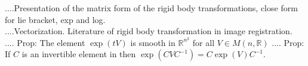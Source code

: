 ....Presentation of the matrix form of the rigid body transformations, close form for lie bracket, exp and log.\\
 ....Vectorization. Literature of rigid body transformation in image registration. \\
 .... Prop: The element $\exp(tV)$ is smooth in $\mathbb{R}^{n^2}$ for all $V \in M(n,\mathbb{R})$
.... Prop:  If $C$ is an invertible element in then $\exp(CVC^{-1}) = C\exp(V)C^{-1}$.
